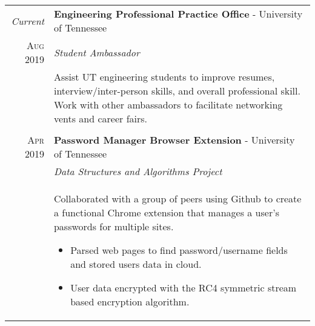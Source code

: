 \documentclass[a4paper,11pt]{article}
\begin{document}
\begin{tabularx}{\textwidth}{r|X}

   \emph{Current} & \textbf{Engineering Professional Practice Office} \-- University of Tennessee\\
   \textsc{Aug 2019} & \emph{Student Ambassador}\\
   & \small{Assist UT engineering students to improve resumes, interview/inter-person skills, and overall professional skill.
            Work with other ambassadors to facilitate networking vents and career fairs.
   }\\

   \multicolumn{2}{c}{} \\

   \textsc{Apr 2019} & \textbf{Password Manager Browser Extension} \-- University of Tennessee\\
   & \emph{Data Structures and Algorithms Project}\\
   & \small{Collaborated with a group of peers using Github to create a functional Chrome extension that manages a user's passwords for multiple sites.
      \begin{itemize}[leftmargin=20pt,topsep=1pt,itemsep=1pt,partopsep=0pt, parsep=1pt]
         \item Parsed web pages to find password/username fields and stored users data in cloud.
         \item User data encrypted with the RC4 symmetric stream based encryption algorithm.
      \vspace{-0.5cm}
      \end{itemize}}\\
\end{tabularx}

\end{document}
